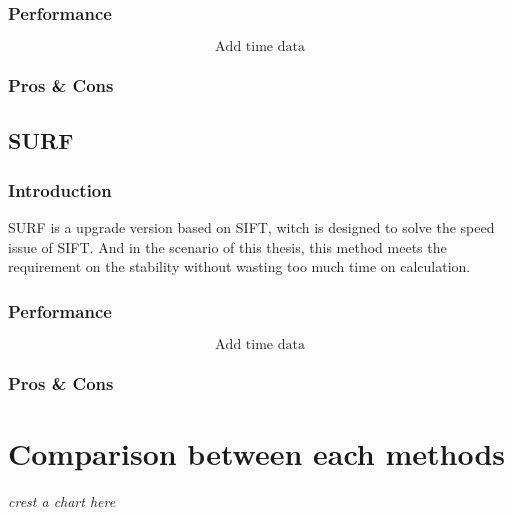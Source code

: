 		\subsubsection{Performance}
			$$\textrm{Add time data}$$
		\subsubsection{Pros \& Cons}
	
	\subsection{SURF}
		\subsubsection{Introduction}
		SURF is a upgrade version based on SIFT, witch is designed to solve the speed issue of SIFT. 
		And in the scenario of this thesis, this method meets the requirement on the stability without wasting too much time on calculation.
		\subsubsection{Performance}
			$$\textrm{Add time data}$$
		\subsubsection{Pros \& Cons}

	

\section{Comparison between each methods}
\emph{crest a chart here}